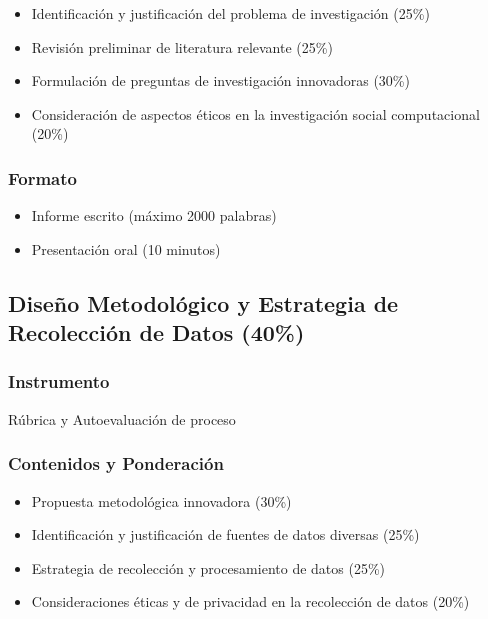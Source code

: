 \documentclass[11pt,letter,]{article}
\providecommand{\tightlist}{%
  \setlength{\itemsep}{0pt}\setlength{\parskip}{0pt}}
\begin{document}
\begin{itemize}
\tightlist
\item
  Identificación y justificación del problema de investigación (25\%)
\item
  Revisión preliminar de literatura relevante (25\%)
\item
  Formulación de preguntas de investigación innovadoras (30\%)
\item
  Consideración de aspectos éticos en la investigación social
  computacional (20\%)
\end{itemize}

\hypertarget{formato}{%
\subsubsection{Formato}\label{formato}}

\begin{itemize}
\tightlist
\item
  Informe escrito (máximo 2000 palabras)
\item
  Presentación oral (10 minutos)
\end{itemize}

\hypertarget{diseuxf1o-metodoluxf3gico-y-estrategia-de-recolecciuxf3n-de-datos-40}{%
\subsection{Diseño Metodológico y Estrategia de Recolección de Datos
(40\%)}\label{diseuxf1o-metodoluxf3gico-y-estrategia-de-recolecciuxf3n-de-datos-40}}

\hypertarget{instrumento-1}{%
\subsubsection{Instrumento}\label{instrumento-1}}

Rúbrica y Autoevaluación de proceso

\hypertarget{contenidos-y-ponderaciuxf3n-1}{%
\subsubsection{Contenidos y
Ponderación}\label{contenidos-y-ponderaciuxf3n-1}}

\begin{itemize}
\tightlist
\item
  Propuesta metodológica innovadora (30\%)
\item
  Identificación y justificación de fuentes de datos diversas (25\%)
\item
  Estrategia de recolección y procesamiento de datos (25\%)
\item
  Consideraciones éticas y de privacidad en la recolección de datos
  (20\%)
\end{itemize}
\end{document}
